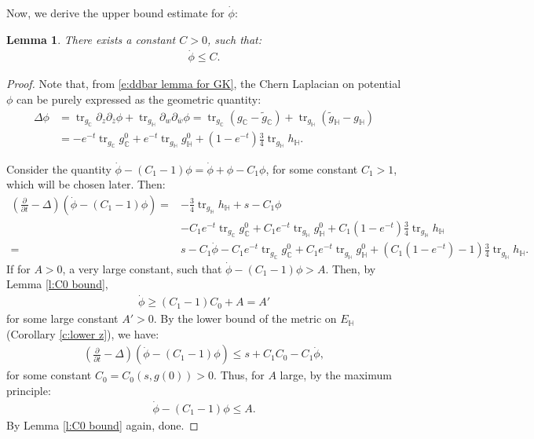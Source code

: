 \documentclass[12pt]{amsart}
\numberwithin{equation}{section}
\newtheorem{lemma}[prop]{Lemma}
\numberwithin{prop}{section}
\theoremstyle{definition}
\newcommand{\til}[1]{\widetilde{#1}}
\renewcommand{\bar}[1]{\overline{#1}}
\begin{document}
Now, we derive the upper bound estimate for $\dot{\phi}$:
\begin{lemma}\label{l:potential derivative upper bound}
    There exists a constant $C>0$, such that:
    \begin{align*}
        \dot{\phi} \leq C. 
    \end{align*}
\end{lemma}
\begin{proof}
    Note that, from \eqref{e:ddbar lemma for GK}, the Chern Laplacian on potential $\phi$ can be purely expressed as the geometric quantity:
    \begin{align*}
        \Delta\phi &= \operatorname{tr}_{g_\mathbb{C}}\partial_z\partial_{\bar{z}}\phi + \operatorname{tr}_{g_\mathbb{H}}\partial_w\partial_{\bar{w}}\phi = \operatorname{tr}_{g_\mathbb{C}}(g_\mathbb{C} - \til{g}_\mathbb{C}) + \operatorname{tr}_{g_\mathbb{H}}(\til{g}_\mathbb{H}-g_\mathbb{H})\\
        & = -e^{-t}\operatorname{tr}_{g_\mathbb{C}}g^0_\mathbb{C} + e^{-t}\operatorname{tr}_{g_\mathbb{H}}g^0_\mathbb{H} + (1-e^{-t})\frac{3}{4}\operatorname{tr}_{g_\mathbb{H}}h_\mathbb{H}.
    \end{align*}

    Consider the quantity $\dot{\phi} - (C_1-1)\phi = \dot{\phi}+\phi - C_1\phi$, for some constant $C_1>1$, which will be chosen later. Then:
    \begin{align*}
        (\frac{\partial}{\partial t} - \Delta)(\dot{\phi}- (C_1 -1)\phi) = &-\frac{3}{4}\operatorname{tr}_{g_\mathbb{H}}h_\mathbb{H} + s - C_1\phi\\
        &-C_1e^{-t}\operatorname{tr}_{g_\mathbb{C}}g^0_\mathbb{C} + C_1e^{-t}\operatorname{tr}_{g_\mathbb{H}}g^0_\mathbb{H} + C_1(1-e^{-t})\frac{3}{4}\operatorname{tr}_{g_\mathbb{H}}h_\mathbb{H}\\
        =&s-C_1\dot{\phi}-C_1e^{-t}\operatorname{tr}_{g_\mathbb{C}}g^0_\mathbb{C} + C_1e^{-t}\operatorname{tr}_{g_\mathbb{H}}g^0_\mathbb{H} + (C_1(1-e^{-t})-1)\frac{3}{4}\operatorname{tr}_{g_\mathbb{H}}h_\mathbb{H}.
    \end{align*}
    If for $A>0$, a very large constant, such that $\dot{\phi} - (C_1-1)\phi>A$. Then, by Lemma \ref{l:C0 bound}, 
    \begin{align*}
        \dot{\phi}\geq (C_1-1)C_0+A = A'
    \end{align*}
    for some large constant $A'>0$. By the lower bound of the metric on $E_\mathbb{H}$ (Corollary \ref{c:lower z}), we have:
    \begin{align*}
         (\frac{\partial}{\partial t} - \Delta)(\dot{\phi}- (C_1 -1)\phi)\leq s+C_1C_0 - C_1\dot{\phi},
    \end{align*}
    for some constant $C_0 = C_0(s,g(0))>0$. Thus, for $A$ large, by the maximum principle:
    \begin{align*}
        \dot{\phi} - (C_1 - 1)\phi \leq A.
    \end{align*}
    By Lemma \ref{l:C0 bound} again, done.
\end{proof}
\end{document}
